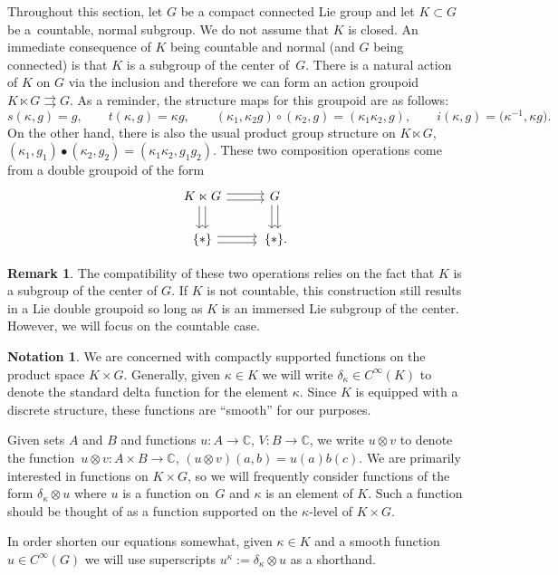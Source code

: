 \documentclass[pdftex]{sigma}
\numberwithin{equation}{section}
\theoremstyle{definition}
\newtheorem{Remark}[Theorem]{Remark}
\newtheorem{notation}[Theorem]{Notation}
\newcommand{\BBC}{\mathbb{C}}
\newcommand{\darrow}{\arrow[d, shift right] \arrow[d, shift left]}
\newcommand{\rarrow}{\arrow[r, shift right] \arrow[r, shift left]}
\newcommand{\grpd}{\rightrightarrows}
\begin{document}
Throughout this section, let $ G $ be a compact connected Lie group and let $ K \subset G $ be a~countable, normal subgroup. We do not assume that $ K $ is closed. An immediate consequence of $ K $ being countable and normal (and $ G $ being connected) is that $ K $ is a subgroup of the center of~$ G $. There is a natural action of $ K $ on $ G $ via the inclusion and therefore we can form an action groupoid
$K \ltimes G \grpd G $.
As a reminder, the structure maps for this groupoid are as follows:
\[ s(\kappa, g) = g, \qquad t(\kappa, g) = \kappa g,\qquad
 (\kappa_1, \kappa_2 g) \circ (\kappa_2, g) = (\kappa_1 \kappa_2, g),  \qquad
 i(\kappa,g) = \big( \kappa^{-1}, \kappa g\big). \]
On the other hand, there is also the usual product group structure on $ K \ltimes G $,
$(\kappa_1, g_1) \bullet (\kappa_2, g_2) = (\kappa_1 \kappa_2, g_1 g_2) $.
These two composition operations come from a double groupoid of the form
\[
\begin{tikzcd}
K \ltimes G \darrow \rarrow & G \darrow \\
\{* \} \rarrow &\, \{ * \}.
\end{tikzcd}
\]
\begin{Remark}
   The compatibility of these two operations relies on the fact that $ K $ is a subgroup of the center of $ G $. If $ K $ is not countable, this construction still results in a Lie double groupoid so long as $ K $ is an immersed Lie subgroup of the center. However, we will focus on the countable case.
\end{Remark}


\begin{notation}
We are concerned with compactly supported functions on the product space $ K \times G $. Generally, given $ \kappa \in K $ we will write $ \delta_\kappa \in C^\infty(K) $ to denote the standard delta function for the element $ \kappa$. Since $ K $ is equipped with a discrete structure, these functions are ``smooth'' for our purposes.

Given sets $ A $ and $ B $ and functions $ u \colon A \to \BBC $, $ V \colon B \to \BBC $, we write $ u \otimes v $ to denote the function~${u \otimes v \colon A \times B \to \BBC}$, $ (u \otimes v)(a,b) = u(a) b(c)$.
We are primarily interested in functions on $ K \times G $, so we will frequently consider functions of the form $ \delta_\kappa \otimes u $ where $ u $ is a function on~$ G $ and $ \kappa $ is an element of $ K $. Such a function should be thought of as a function supported on the $ \kappa$-level of $ K \times G $.

In order shorten our equations somewhat, given $ \kappa \in K $ and a smooth function $ u \in C^\infty(G) $ we will use superscripts
$u^\kappa := \delta_{\kappa} \otimes u $
as a shorthand.
\end{notation}
\end{document}
